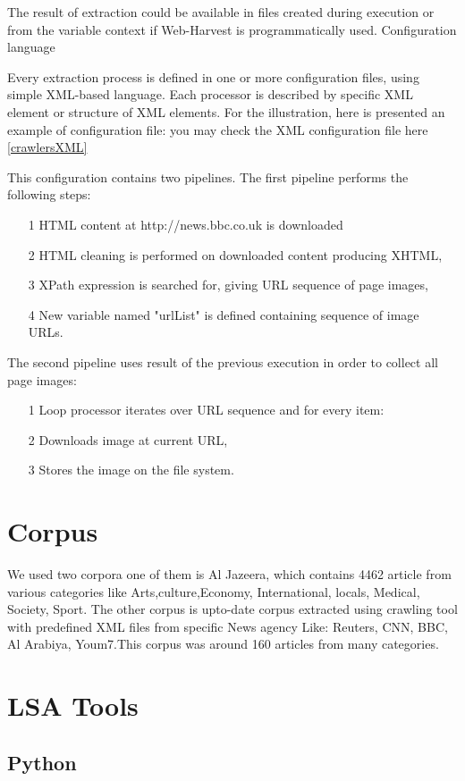 The result of extraction could be available in files created during execution or from the variable context if Web-Harvest is programmatically used.
Configuration language

Every extraction process is defined in one or more configuration files, using simple XML-based language. Each processor is described by specific XML element or structure of XML elements. For the illustration, here is presented an example of configuration file:
you may check the XML configuration file here \ref{crawlersXML}

This configuration contains two pipelines. The first pipeline performs the following steps:
\begin{itemize}
\item [1] HTML content at http://news.bbc.co.uk is downloaded
\item [2] HTML cleaning is performed on downloaded content producing XHTML,
\item [3] XPath expression is searched for, giving URL sequence of page images,
\item [4] New variable named "urlList" is defined containing sequence of image URLs.
\end{itemize}
The second pipeline uses result of the previous execution in order to collect all page images:
\begin{itemize}
\item [1] Loop processor iterates over URL sequence and for every item:
\item [2] Downloads image at current URL,
\item [3] Stores the image on the file system.
\end{itemize}


\section{Corpus}
We used two corpora one of them is Al Jazeera, which contains 4462 article from various categories like Arts,culture,Economy, International, locals, Medical, Society, Sport.
The other corpus is upto-date corpus extracted using crawling tool with predefined XML files from specific News agency Like: Reuters, CNN, BBC, Al Arabiya, Youm7.This corpus was around 160 articles from many categories.


\section{LSA Tools}
\subsection{Python}
